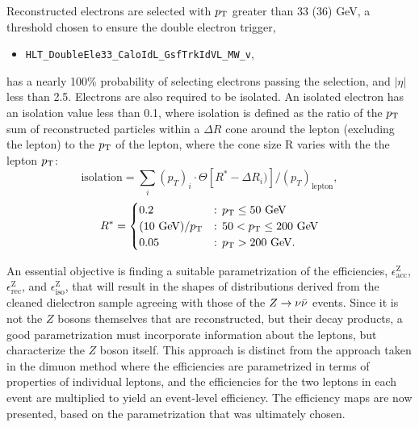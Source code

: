 Reconstructed electrons are selected with $p_{\text{T}}$ greater than 33 (36) GeV, a threshold chosen to ensure the double electron trigger,
\begin{itemize}
  \item \texttt{HLT\_DoubleEle33\_CaloIdL\_GsfTrkIdVL\_MW\_v},
\end{itemize}
has a nearly 100\% probability of selecting electrons passing the selection, and $|\eta|$ less than 2.5. Electrons are also required to be isolated.  An isolated electron has an isolation value less than 0.1,  where isolation is defined as the ratio of the $p_{\text{T}}$ sum of reconstructed particles within a $\Delta R$ cone around the lepton (excluding the lepton) to the $p_{\text{T}}$ of the lepton, where the cone size R varies with the the lepton $p_{\text{T}}$:
\begin{equation}
\text{isolation} = \sum_{i}(p_{T})_i \cdot \Theta[R^*-\Delta R_{i})]/(p_T)_{\text{lepton}},
\label{eq:isolation}
\end{equation}
\[
R^* = 
  \begin{cases} 
  0.2 & \text{: } p_{\text{T}} \leq 50 \text{ GeV} \\
  (10 \text{ GeV})/p_{\text{T}} & \text{: } 50 < p_{\text{T}} \leq 200 \text{ GeV} \\  
   0.05 & \text{: } p_{\text{T}} > 200 \text{ GeV}. \\
  \end{cases}
\]
\noindent 

An essential objective is finding a suitable parametrization of the efficiencies, $\epsilon^{\text{Z}}_{\text{acc}}$, $\epsilon^{\text{Z}}_{\text{rec}}$, and $\epsilon^{\text{Z}}_{\text{iso}}$, that will result in the shapes of distributions derived from the cleaned dielectron sample agreeing with those of the $Z\rightarrow \nu\bar{\nu}$ events. Since it is not the $Z$ bosons themselves that are reconstructed, but their decay products, a good parametrization must incorporate information about the leptons, but characterize the $Z$ boson itself.  This approach is distinct from the approach taken in the dimuon method where the efficiencies are parametrized in terms of properties of individual leptons, and the efficiencies for the two leptons in each event are multiplied to yield an event-level efficiency. The efficiency maps are now presented, based on the parametrization that was ultimately chosen. 

